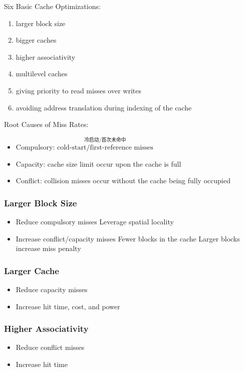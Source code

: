 Six Basic Cache Optimizations:
\begin{enumerate}\small
    \item larger block size
    \item bigger caches
    \item higher associativity
    \item multilevel caches
    \item giving priority to read misses over writes
    \item avoiding address translation during indexing of the cache
\end{enumerate}

Root Causes of Miss Rates:
\begin{itemize}
    \item Compulsory: $\overset{\text{冷启动/首次未命中}}{\text{cold-start/first-reference misses}}$
    \item Capacity: cache size limit
    \subitem occur upon the cache is full
    \item Conflict: collision misses
    \subitem occur without the cache being fully occupied
\end{itemize}

\subsubsection{Larger Block Size}
\begin{itemize}
    \item Reduce compulsory misses
    \subitem Leverage spatial locality
    \item Increase conflict/capacity misses
    \subitem Fewer blocks in the cache
    \subitem Larger blocks increase miss penalty
\end{itemize}

\subsubsection{Larger Cache}
\begin{itemize}
    \item Reduce capacity misses
    \item Increase hit time, cost, and power
\end{itemize}

\subsubsection{Higher Associativity}
\begin{itemize}
    \item Reduce conflict misses
    \item Increase hit time
\end{itemize}

